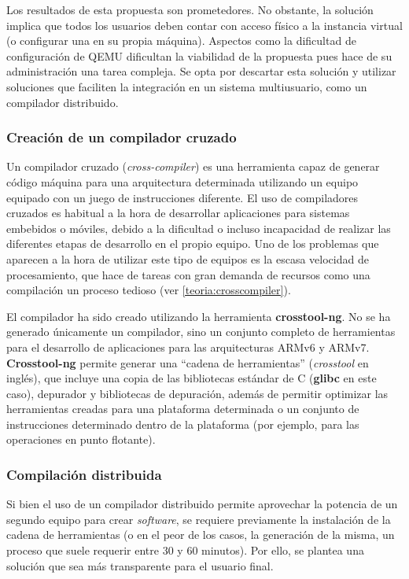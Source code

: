 Los resultados de esta propuesta son prometedores. No obstante, la solución implica que todos los usuarios deben contar con acceso físico a la instancia virtual (o configurar una en su propia máquina). Aspectos como la dificultad de configuración de QEMU dificultan la viabilidad de la propuesta pues hace de su administración una tarea compleja. Se opta por descartar esta solución y utilizar soluciones que faciliten la integración en un sistema multiusuario, como un compilador distribuido.

\subsubsection{Creación de un compilador cruzado}

Un compilador cruzado (\textit{cross-compiler}) es una herramienta capaz de generar código máquina para una arquitectura determinada utilizando un equipo equipado con un juego de instrucciones diferente.
El uso de compiladores cruzados es habitual a la hora de desarrollar aplicaciones para sistemas embebidos o móviles, debido a la dificultad o incluso incapacidad de realizar las diferentes etapas de desarrollo en el propio equipo. Uno de los problemas que aparecen a la hora de utilizar este tipo de equipos es la escasa velocidad de procesamiento, que hace de tareas con gran demanda de recursos como una compilación un proceso tedioso (ver \ref{teoria:crosscompiler}).

El compilador ha sido creado utilizando la herramienta \textbf{crosstool-ng}. No se ha generado únicamente un compilador, sino un conjunto completo de herramientas para el desarrollo de aplicaciones para las arquitecturas ARMv6 y ARMv7. \textbf{Crosstool-ng} permite generar una ``cadena de herramientas'' (\textit{crosstool} en inglés), que incluye una copia de las bibliotecas estándar de C (\textbf{glibc} en este caso), depurador y bibliotecas de depuración, además de permitir optimizar las herramientas creadas para una plataforma determinada o un conjunto de instrucciones determinado dentro de la plataforma (por ejemplo, para las operaciones en punto flotante).

\subsubsection{Compilación distribuida}

Si bien el uso de un compilador distribuido permite aprovechar la potencia de un segundo equipo para crear \textit{software}, se requiere previamente la instalación de la cadena de herramientas (o en el peor de los casos, la generación de la misma, un proceso que suele requerir entre 30 y 60 minutos). Por ello, se plantea una solución que sea más transparente para el usuario final.

